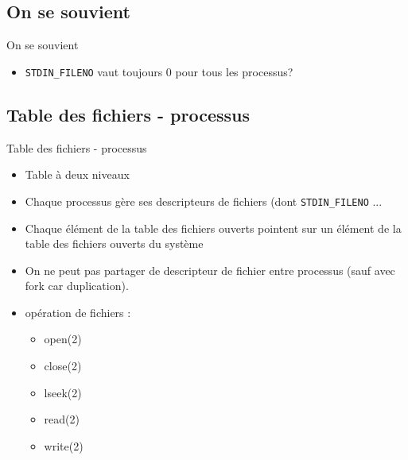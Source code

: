 \begin{frame}{\sectitle}
\def\subsectitle{On se souvient}
\subsection{\subsectitle}
\begin{exampleblock}{\subsectitle}
\begin{itemize}
    \item \texttt{STDIN\_FILENO} vaut toujours 0 pour tous les processus?
\end{itemize}
\end{exampleblock}

\def\subsectitle{Table des fichiers - processus}
\subsection{\subsectitle}
\begin{block}{\subsectitle}
\begin{itemize} 
    \item Table à deux niveaux
    \item Chaque processus gère ses descripteurs de fichiers (dont
    \texttt{STDIN\_FILENO} ...
    \item Chaque élément de la table des fichiers ouverts pointent sur un
    élément de la table des fichiers ouverts du système
    \item On ne peut pas partager de descripteur de fichier entre processus
    (sauf avec fork car duplication).
\end{itemize}
\end{block}
\end{frame}

\begin{frame}{\sectitle}
\begin{block}{\subsectitle}
\begin{itemize}
    \item opération de fichiers : 
    \begin{itemize}
        \item open(2)
        \item close(2)
        \item lseek(2)
        \item read(2)
        \item write(2)
    \end{itemize}
\end{itemize}
\end{block}
\end{frame}


